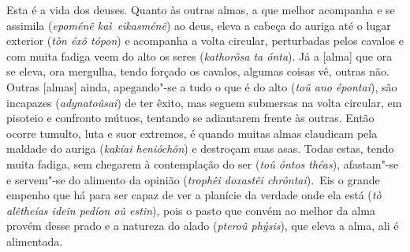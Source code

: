 \bekker{[248a]} Esta é a vida dos deuses. Quanto às outras almas, a que
melhor acompanha e se assimila (\emph{epoménê kaì}~\emph{eikasménê}) ao
deus, eleva a cabeça do auriga até o lugar exterior (\emph{tòn éxô
tópon}) e acompanha a volta circular, perturbadas pelos cavalos e com
muita fadiga veem do alto os seres (\emph{kathorôsa ta ónta}). Já a
[alma] que ora se eleva, ora mergulha, tendo forçado os cavalos,
algumas coisas vê, outras não. Outras [almas] ainda, apegando"-se a
tudo o que é do alto (\emph{toû ano épontai}), são incapazes
(\emph{adynatoûsai}) de ter êxito, mas seguem submersas na volta
circular, em pisoteio e confronto mútuos, tentando se adiantarem frente
às outras. \bekker{[248b]} Então ocorre tumulto, luta e suor extremos, é
quando muitas almas claudicam pela maldade do auriga (\emph{kakíai
henióchôn}) e destroçam suas asas. Todas estas, tendo muita fadiga, sem
chegarem à contemplação do ser (\emph{toû óntos théas}), afastam"-se e
servem"-se do alimento da opinião (\emph{trophêi doxastêi chrôntai}).~Eis
o grande empenho que há para ser capaz de ver a planície da verdade onde
ela está (\emph{tò alêtheías ideîn pedíon oû estin}), pois o pasto que
convém ao melhor da alma provém desse prado e a natureza do alado
(\emph{pteroû phýsis}), que eleva a alma, \bekker{[248c]} ali é alimentada.


